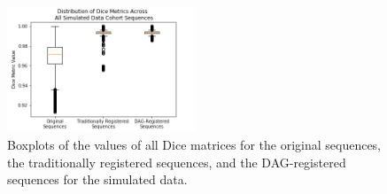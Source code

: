 \clearpage

\begin{figure}
\centering
\includegraphics[width=0.5\textwidth]{6/figures/spectr-dice-box.png}
\caption{Boxplots of the values of all Dice matrices for the original sequences, the traditionally registered sequences, and the DAG-registered sequences for the simulated data.}
\label{fig:spectr-dice-box}
\end{figure}

